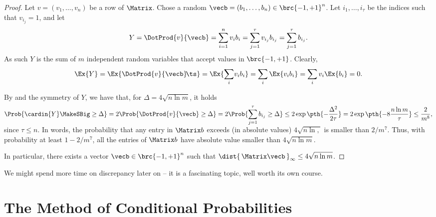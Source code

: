 \begin{proof}
    Let $v = (v_1, \ldots, v_n)$ be a row of $\Matrix$. Chose a random
    $\vecb = (b_1, \ldots, b_n) \in \brc{-1,+1}^n$.  Let
    $i_1,\ldots, i_\tau$ be the indices such that $v_{i_j} =1$, and
    let
    \begin{equation*}
        Y%
        =%
        \DotProd{v}{\vecb} = \sum_{i=1}^n v_i b_i = \sum_{j=1}^\tau v_{i_j}
        b_{i_j}%
        =%
        \sum_{j=1}^\tau b_{i_j}.
    \end{equation*}
    As such $Y$ is the sum of $m$ independent random variables that
    accept values in $\brc{-1,+1}$.  Clearly,
    \begin{equation*}
        \Ex{Y}%
        =%
        \Ex{\bigl. \DotProd{v}{\vecb}\!\ts  }%
        =%
        \Ex{\Bigl.\smash{\sum_{i}} v_i b_i} =%
        \sum_{i} \Ex{v_i b_i} = \sum_{i} v_i \Ex{b_{i}} = 0.
    \end{equation*}

    By  and the
    symmetry of $Y$, we have that, for $\Delta = 4 \sqrt{n \ln{m}}$,
    it holds
    \begin{equation*}
        \Prob{\bigl.\cardin{Y}\MakeSBig \geq \Delta} 
        = %
        2 \Prob{\bigl. \DotProd{v}{\vecb}  \geq \Delta }
        =%
        2 \Prob{\Bigl. \smash{\sum_{j=1}^\tau b_{i_j}} \geq \Delta}%
        \leq%
        2 \exp \pth{ - \frac{\Delta^2}{2\tau}}
        =%
        2 \exp \pth{-8 {\frac{n\ln m}{\tau}}}%
        \leq%
        \frac{2}{m^{8}},
    \end{equation*}
    since $\tau \leq n$.  In words, the probability that any entry in
    $\Matrix b$ exceeds (in absolute values) $4 \sqrt{ n\ln ,}$ is
    smaller than $2/m^7$. Thus, with probability at least $1 - 2/m^7$,
    all the entries of $\Matrix b$ have absolute value smaller than
    $4 \sqrt{n \ln m}$.
    
   In particular, there exists a vector $\vecb \in \brc{-1,+1}^n$ such
   that $\dist{\,\Matrix \vecb \, }_{\infty} \leq 4 \sqrt{n \ln m}$.
\end{proof}

We might spend more time on discrepancy later on -- it is a
fascinating topic, well worth its own course.



\section{The Method of Conditional Probabilities}

